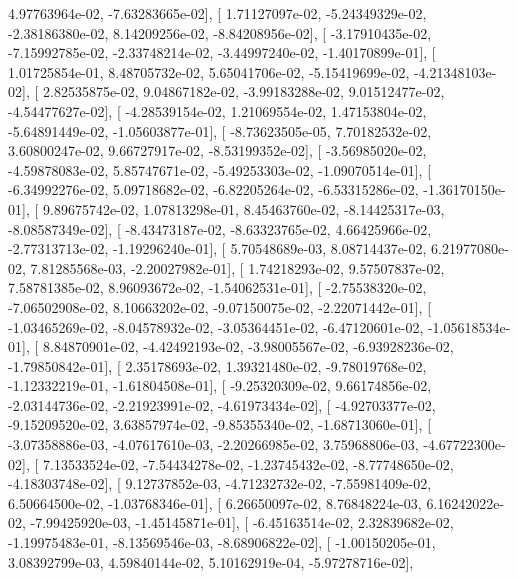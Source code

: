 \documentclass{article}
\begin{document}
          4.97763964e-02,  -7.63283665e-02],
       [  1.71127097e-02,  -5.24349329e-02,  -2.38186380e-02,
          8.14209256e-02,  -8.84208956e-02],
       [ -3.17910435e-02,  -7.15992785e-02,  -2.33748214e-02,
         -3.44997240e-02,  -1.40170899e-01],
       [  1.01725854e-01,   8.48705732e-02,   5.65041706e-02,
         -5.15419699e-02,  -4.21348103e-02],
       [  2.82535875e-02,   9.04867182e-02,  -3.99183288e-02,
          9.01512477e-02,  -4.54477627e-02],
       [ -4.28539154e-02,   1.21069554e-02,   1.47153804e-02,
         -5.64891449e-02,  -1.05603877e-01],
       [ -8.73623505e-05,   7.70182532e-02,   3.60800247e-02,
          9.66727917e-02,  -8.53199352e-02],
       [ -3.56985020e-02,  -4.59878083e-02,   5.85747671e-02,
         -5.49253303e-02,  -1.09070514e-01],
       [ -6.34992276e-02,   5.09718682e-02,  -6.82205264e-02,
         -6.53315286e-02,  -1.36170150e-01],
       [  9.89675742e-02,   1.07813298e-01,   8.45463760e-02,
         -8.14425317e-03,  -8.08587349e-02],
       [ -8.43473187e-02,  -8.63323765e-02,   4.66425966e-02,
         -2.77313713e-02,  -1.19296240e-01],
       [  5.70548689e-03,   8.08714437e-02,   6.21977080e-02,
          7.81285568e-03,  -2.20027982e-01],
       [  1.74218293e-02,   9.57507837e-02,   7.58781385e-02,
          8.96093672e-02,  -1.54062531e-01],
       [ -2.75538320e-02,  -7.06502908e-02,   8.10663202e-02,
         -9.07150075e-02,  -2.22071442e-01],
       [ -1.03465269e-02,  -8.04578932e-02,  -3.05364451e-02,
         -6.47120601e-02,  -1.05618534e-01],
       [  8.84870901e-02,  -4.42492193e-02,  -3.98005567e-02,
         -6.93928236e-02,  -1.79850842e-01],
       [  2.35178693e-02,   1.39321480e-02,  -9.78019768e-02,
         -1.12332219e-01,  -1.61804508e-01],
       [ -9.25320309e-02,   9.66174856e-02,  -2.03144736e-02,
         -2.21923991e-02,  -4.61973434e-02],
       [ -4.92703377e-02,  -9.15209520e-02,   3.63857974e-02,
         -9.85355340e-02,  -1.68713060e-01],
       [ -3.07358886e-03,  -4.07617610e-03,  -2.20266985e-02,
          3.75968806e-03,  -4.67722300e-02],
       [  7.13533524e-02,  -7.54434278e-02,  -1.23745432e-02,
         -8.77748650e-02,  -4.18303748e-02],
       [  9.12737852e-03,  -4.71232732e-02,  -7.55981409e-02,
          6.50664500e-02,  -1.03768346e-01],
       [  6.26650097e-02,   8.76848224e-03,   6.16242022e-02,
         -7.99425920e-03,  -1.45145871e-01],
       [ -6.45163514e-02,   2.32839682e-02,  -1.19975483e-01,
         -8.13569546e-03,  -8.68906822e-02],
       [ -1.00150205e-01,   3.08392799e-03,   4.59840144e-02,
          5.10162919e-04,  -5.97278716e-02],
\end{document}
